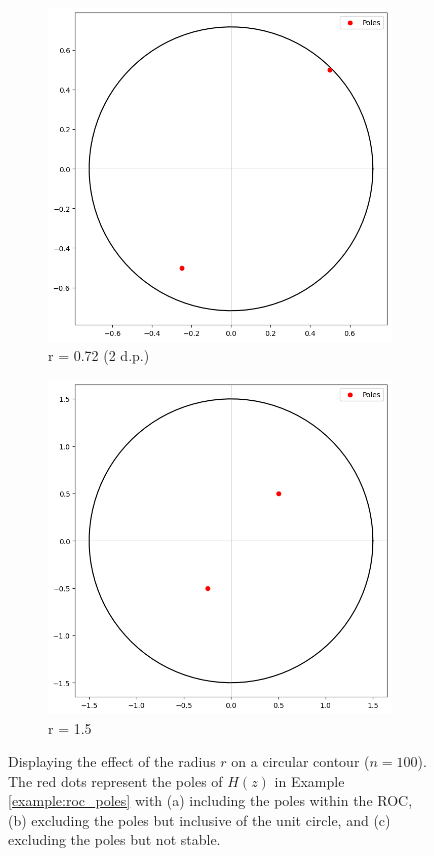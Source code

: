 \documentclass[a4paper]{report}
\begin{document}
\begin{figure}[H]
\begin{subfigure}{.25\linewidth}
      \includegraphics[width=\linewidth]{images/valid_border_contour.png}
      \caption{r = 0.72 (2 d.p.)}
    \end{subfigure}\hfill
    \begin{subfigure}{.25\linewidth}
      \includegraphics[width=\linewidth]{images/unstable_contour.png}
      \caption{r = 1.5}
    \end{subfigure}\hfill
    
    \caption{ Displaying the effect of the radius $r$ on a circular contour ($n = 100$). The red dots represent the poles of $H(z)$ in Example \ref{example:roc_poles} with (a) including the poles within the ROC, (b) excluding the poles but inclusive of the unit circle, and (c) excluding the poles but not stable.}
\end{figure}
\end{document}
